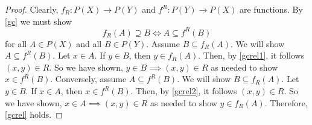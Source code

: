 \documentclass[
  twoside,
  12pt,
  letterpaper,
  fleqn]{article}
\theoremstyle{plain}
\theoremstyle{definition}
\theoremstyle{definition}
\theoremstyle{remark}
\begin{document}
\begin{proof}

Clearly, \(f_R:P(X)\to P(Y)\) and \(f^R:P(Y)\to P(X)\) are functions. By
\eqref{gc} we must show \begin{equation}
\label{gcrel}
f_R(A)\supseteq B \Longleftrightarrow A\subseteq f^R(B)
\end{equation} for all \(A\in P(X)\) and all \(B\in P(Y)\). Assume
\(B\subseteq f_R(A)\). We will show \(A\subseteq f^R(B)\). Let
\(x\in A\). If \(y\in B\), then \(y\in f_R(A)\). Then, by
\eqref{gcrel1}, it follows \((x,y)\in R\). So we have shown,
\(y\in B\implies (x,y)\in R\) as needed to show \(x\in f^R(B)\).
Conversely, assume \(A\subseteq f^R(B)\). We will show
\(B\subseteq f_R(A)\). Let \(y\in B\). If \(x\in A\), then
\(x\in f^R(B)\). Then, by \eqref{gcrel2}, it follows \((x,y)\in R\). So
we have shown, \(x\in A\implies (x,y)\in R\) as needed to show
\(y\in f_R(A)\). Therefore, \eqref{gcrel} holds.

\end{proof}


\printbibliography



\thispagestyle{empty}
\end{document}

